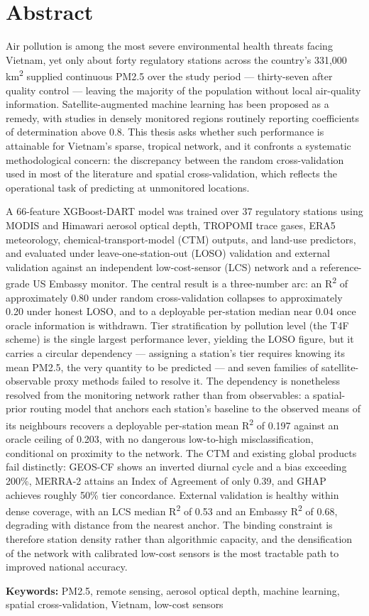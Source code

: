 \chapter*{Abstract}

Air pollution is among the most severe environmental health threats facing Vietnam, yet only about forty regulatory stations across the country's 331,000 km\textsuperscript{2} supplied continuous PM2.5 over the study period --- thirty-seven after quality control --- leaving the majority of the population without local air-quality information. Satellite-augmented machine learning has been proposed as a remedy, with studies in densely monitored regions routinely reporting coefficients of determination above 0.8. This thesis asks whether such performance is attainable for Vietnam's sparse, tropical network, and it confronts a systematic methodological concern: the discrepancy between the random cross-validation used in most of the literature and spatial cross-validation, which reflects the operational task of predicting at unmonitored locations.

A 66-feature XGBoost-DART model was trained over 37 regulatory stations using MODIS and Himawari aerosol optical depth, TROPOMI trace gases, ERA5 meteorology, chemical-transport-model (CTM) outputs, and land-use predictors, and evaluated under leave-one-station-out (LOSO) validation and external validation against an independent low-cost-sensor (LCS) network and a reference-grade US Embassy monitor. The central result is a three-number arc: an R\textsuperscript{2} of approximately 0.80 under random cross-validation collapses to approximately 0.20 under honest LOSO, and to a deployable per-station median near 0.04 once oracle information is withdrawn. Tier stratification by pollution level (the T4F scheme) is the single largest performance lever, yielding the LOSO figure, but it carries a circular dependency --- assigning a station's tier requires knowing its mean PM2.5, the very quantity to be predicted --- and seven families of satellite-observable proxy methods failed to resolve it. The dependency is nonetheless resolved from the monitoring network rather than from observables: a spatial-prior routing model that anchors each station's baseline to the observed means of its neighbours recovers a deployable per-station mean R\textsuperscript{2} of 0.197 against an oracle ceiling of 0.203, with no dangerous low-to-high misclassification, conditional on proximity to the network. The CTM and existing global products fail distinctly: GEOS-CF shows an inverted diurnal cycle and a bias exceeding 200\%, MERRA-2 attains an Index of Agreement of only 0.39, and GHAP achieves roughly 50\% tier concordance. External validation is healthy within dense coverage, with an LCS median R\textsuperscript{2} of 0.53 and an Embassy R\textsuperscript{2} of 0.68, degrading with distance from the nearest anchor. The binding constraint is therefore station density rather than algorithmic capacity, and the densification of the network with calibrated low-cost sensors is the most tractable path to improved national accuracy.

\textbf{Keywords:} PM2.5, remote sensing, aerosol optical depth, machine learning, spatial cross-validation, Vietnam, low-cost sensors

